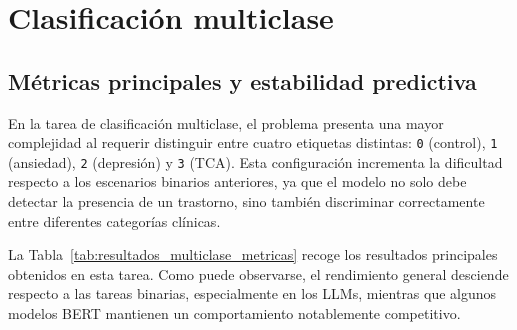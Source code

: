 \section{Clasificación multiclase}

\subsection{Métricas principales y estabilidad predictiva}

En la tarea de clasificación multiclase, el problema presenta una mayor complejidad al requerir distinguir entre cuatro etiquetas distintas: \texttt{0} (control), \texttt{1} (ansiedad), \texttt{2} (depresión) y \texttt{3} (\ac{TCA}). Esta configuración incrementa la dificultad respecto a los escenarios binarios anteriores, ya que el modelo no solo debe detectar la presencia de un trastorno, sino también discriminar correctamente entre diferentes categorías clínicas.

La Tabla~\ref{tab:resultados_multiclase_metricas} recoge los resultados principales obtenidos en esta tarea. Como puede observarse, el rendimiento general desciende respecto a las tareas binarias, especialmente en los \acp{LLM}, mientras que algunos modelos BERT mantienen un comportamiento notablemente competitivo.

